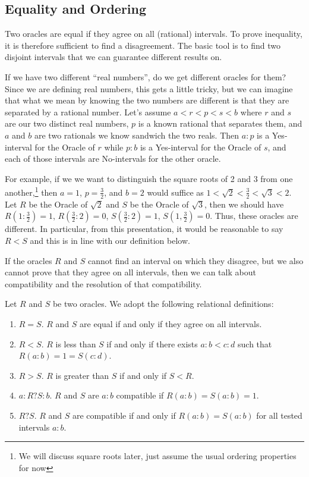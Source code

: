\documentclass[12pt]{article}
\begin{document}
\subsection{Equality and Ordering}

Two oracles are equal if they agree on all (rational) intervals. To prove inequality, it is therefore sufficient to find a disagreement. The basic tool is to find two disjoint intervals that we can guarantee different results on. 

If we have two different ``real numbers'', do we get different oracles for them? Since we are defining real numbers, this gets a little tricky, but we can imagine that what we mean by knowing the two numbers are different is that they are separated by a rational number. Let's assume $a < r < p < s < b$ where $r$ and $s$ are our two distinct real numbers,  $p$ is a known rational that separates them, and $a$ and $b$ are two rationals we know sandwich the two reals. Then $a:p$ is a Yes-interval for the Oracle of $r$ while $p:b$ is a Yes-interval for the Oracle of $s$, and each of those intervals are No-intervals for the other oracle. 

For example, if we we want to distinguish the square roots of 2 and 3 from one another,\footnote{We will discuss square roots later, just assume the usual ordering properties for now} then $a = 1$, $p = \tfrac{3}{2}$, and $b = 2$ would suffice as $1 < \sqrt{2} < \tfrac{3}{2} < \sqrt{3} < 2$. Let $R$ be the Oracle of $\sqrt{2}$ and $S$ be the Oracle of $\sqrt{3}$, then we should have $R(1:\tfrac{3}{2}) = 1$, $R(\tfrac{3}{2}:2) = 0$,  $S(\tfrac{3}{2}:2) = 1$, $S(1, \tfrac{3}{2}) = 0$. Thus, these oracles are different. In particular, from this presentation, it would be reasonable to say $R < S$ and this is in line with our definition below.

If the oracles $R$ and $S$ cannot find an interval on which they disagree, but we also cannot prove that they agree on all intervals, then we can talk about compatibility and the resolution of that compatibility.

Let $R$ and $S$ be two oracles. We adopt the following relational definitions:

\begin{enumerate}
    \item $R=S$. $R$ and $S$ are equal if and only if they agree on all intervals. 
    \item $R < S$. $R$ is less than $S$ if and only if there exists $a:b < c:d$ such that $R(a:b) =1 = S(c:d)$. 
    \item $R > S$. $R$ is greater than $S$ if and only if $S < R$.
    \item $a:R?S:b$. $R$ and $S$ are $a:b$ compatible if $R(a:b)=S(a:b) = 1$.
    \item $R ? S$. $R$ and $S$ are compatible if and only if $R(a:b) = S(a:b)$ for all tested intervals $a:b$. 
\end{enumerate}
\end{document}
